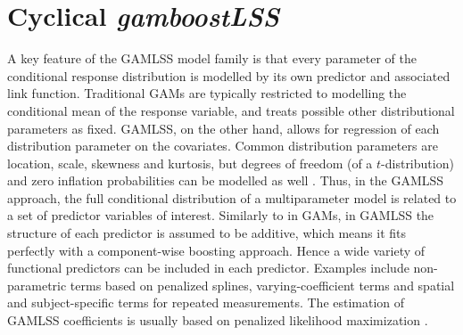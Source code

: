 \section{Cyclical \textit{gamboostLSS}}\label{sec:gamlssboost}
A key feature of the GAMLSS model family is that every parameter of the conditional response distribution is modelled by its own predictor and associated link function.
Traditional GAMs \citep{gam-book} are typically restricted to modelling the conditional mean of the response variable, and treats possible other distributional parameters as fixed.
GAMLSS, on the other hand, allows for regression of each distribution parameter on the covariates.
Common distribution parameters are location, scale, skewness and kurtosis, but degrees of freedom (of a $t$-distribution) and zero inflation probabilities can be modelled as well \citep{gamboostlss-paper, gamboostLSS-manual}.
Thus, in the GAMLSS approach, the full conditional distribution of a multiparameter model is related to a set of predictor variables of interest.
Similarly to in GAMs, in GAMLSS the structure of each predictor is assumed to be additive, which means it fits perfectly with a component-wise boosting approach.
Hence a wide variety of functional predictors can be included in each predictor.
Examples include non-parametric terms based on penalized splines, varying-coefficient terms and spatial and subject-specific terms for repeated measurements.
The estimation of GAMLSS coefficients is usually based on penalized likelihood maximization \citep[see]{gamlss}.

